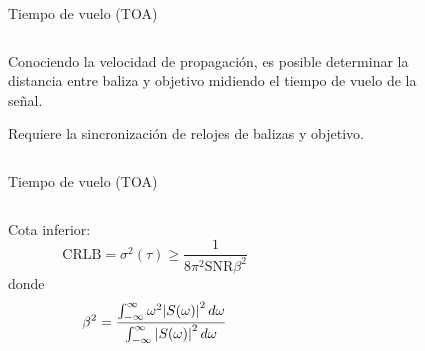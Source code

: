 \documentclass{beamer}
\begin{document}
    \begin{frame}{Tiempo de vuelo (TOA)}
      \begin{columns}
        \begin{column}{0.5\textwidth}
          Conociendo la velocidad de propagación, es posible determinar la distancia entre baliza y objetivo midiendo el tiempo de vuelo de la señal.

          \vspace{.5cm}
          Requiere la sincronización de relojes de balizas y objetivo.
        \end{column}
        \begin{column}{0.5\textwidth}  
          \begin{figure}[H]
            \centering
            \def\svgwidth{\linewidth}
            
            \label{fig:TOA}
        \end{figure}
        \end{column}
      \end{columns}
    \end{frame}

    \begin{frame}{Tiempo de vuelo (TOA)}
      \begin{columns}
        \begin{column}{0.5\textwidth}
          Cota inferior:
          \begin{equation*}\label{eq:CRLB_TOA}
            \text{CRLB} = \sigma^2(\tau) \geq \frac{1}{8\pi^2\text{SNR}\beta^2}
        \end{equation*}
        donde
        \begin{equation*}
          \beta^2 = \frac{\int_{-\infty}^{\infty} \omega^2 \abs{S(\omega)}^2\dd{\omega}}{\int_{-\infty}^{\infty} \abs{S(\omega)}^2\dd{\omega}}
      \end{equation*}
        \end{column}
        \begin{column}{0.5\textwidth}  
          \begin{figure}[H]
            \centering
            \def\svgwidth{\linewidth}
            
            \label{fig:TOA}
        \end{figure}
        \end{column}
      \end{columns}
    \end{frame}
\end{document}
